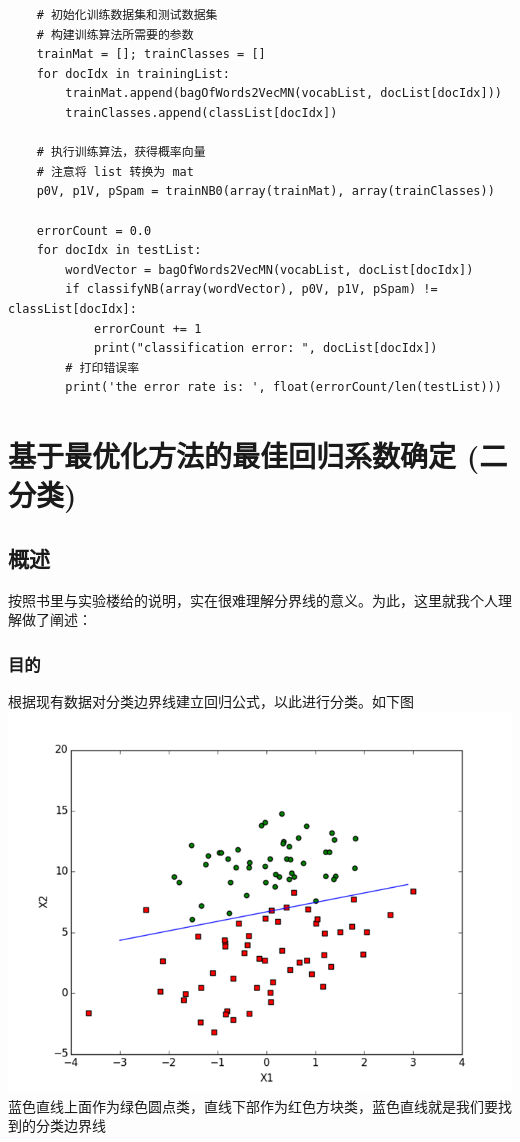 \documentclass[11pt]{ctexart}
\begin{document}
\begin{enumerate}
\begin{enumerate}
\begin{lstlisting}
    # 初始化训练数据集和测试数据集
    # 构建训练算法所需要的参数
    trainMat = []; trainClasses = []
    for docIdx in trainingList:
        trainMat.append(bagOfWords2VecMN(vocabList, docList[docIdx]))
        trainClasses.append(classList[docIdx])

    # 执行训练算法，获得概率向量
    # 注意将 list 转换为 mat
    p0V, p1V, pSpam = trainNB0(array(trainMat), array(trainClasses))

    errorCount = 0.0
    for docIdx in testList:
        wordVector = bagOfWords2VecMN(vocabList, docList[docIdx])
        if classifyNB(array(wordVector), p0V, p1V, pSpam) != classList[docIdx]:
            errorCount += 1
            print("classification error: ", docList[docIdx])
        # 打印错误率
        print('the error rate is: ', float(errorCount/len(testList)))
\end{lstlisting}
\end{enumerate}
\end{enumerate}
\section{基于最优化方法的最佳回归系数确定 (二分类)}
\label{sec:orgheadline66}
\subsection{概述}
\label{sec:orgheadline56}
按照书里与实验楼给的说明，实在很难理解分界线的意义。为此，这里就我个人理解做了阐述：
\subsubsection{目的}
\label{sec:orgheadline47}
根据现有数据对分类边界线建立回归公式，以此进行分类。如下图
\includegraphics[width=.9\linewidth]{figs/logistic_01.png}
蓝色直线上面作为绿色圆点类，直线下部作为红色方块类，蓝色直线就是我们要找到的分类边界线
\end{document}
